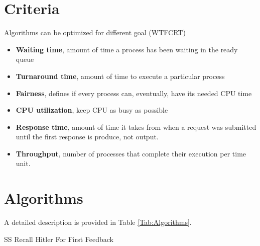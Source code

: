 \section{Criteria}
Algorithms can be optimized for different goal (WTFCRT)
\begin{itemize}
\item \textbf{Waiting time}, amount of time a process has been waiting in the ready queue
\item \textbf{Turnaround time}, amount of time to execute a particular process
\item \textbf{Fairness}, defines if every process can, eventually, have its needed CPU time
\item \textbf{CPU utilization}, keep CPU as busy as possible
\item \textbf{Response time}, amount of time it takes from when a request was submitted until the first response is produce, not output.
\item \textbf{Throughput}, number of processes that complete their execution per time unit.


\end{itemize}

\section{Algorithms}
A detailed description is provided in Table \ref{Tab:Algorithms}.

SS Recall Hitler For First Feedback


